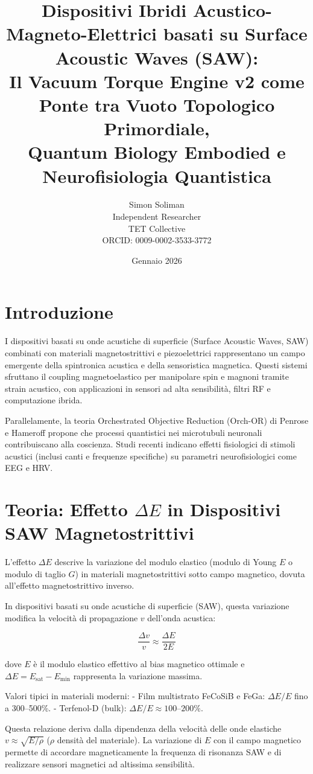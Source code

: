 \documentclass[11pt,a4paper]{article}
\title{Dispositivi Ibridi Acustico-Magneto-Elettrici basati su Surface Acoustic Waves (SAW): \\
Il Vacuum Torque Engine v2 come Ponte tra Vuoto Topologico Primordiale, \\
Quantum Biology Embodied e Neurofisiologia Quantistica}
\author{Simon Soliman \\
Independent Researcher \\
TET Collective \\
ORCID: 0009-0002-3533-3772}
\date{Gennaio 2026}
\begin{document}
\maketitle

\section{Introduzione}
I dispositivi basati su onde acustiche di superficie (Surface Acoustic Waves, SAW) combinati con materiali magnetostrittivi e piezoelettrici rappresentano un campo emergente della spintronica acustica e della sensoristica magnetica. Questi sistemi sfruttano il coupling magnetoelastico per manipolare spin e magnoni tramite strain acustico, con applicazioni in sensori ad alta sensibilità, filtri RF e computazione ibrida.

Parallelamente, la teoria Orchestrated Objective Reduction (Orch-OR) di Penrose e Hameroff propone che processi quantistici nei microtubuli neuronali contribuiscano alla coscienza. Studi recenti indicano effetti fisiologici di stimoli acustici (inclusi canti e frequenze specifiche) su parametri neurofisiologici come EEG e HRV.


\section{Teoria: Effetto $\Delta E$ in Dispositivi SAW Magnetostrittivi}

L'effetto $\Delta E$ descrive la variazione del modulo elastico (modulo di Young $E$ o modulo di taglio $G$) in materiali magnetostrittivi sotto campo magnetico, dovuta all'effetto magnetostrittivo inverso.

In dispositivi basati su onde acustiche di superficie (SAW), questa variazione modifica la velocità di propagazione $v$ dell'onda acustica:

\begin{equation}
\frac{\Delta v}{v} \approx \frac{\Delta E}{2E}
\end{equation}

dove $E$ è il modulo elastico effettivo al bias magnetico ottimale e $\Delta E = E_{\text{sat}} - E_{\text{min}}$ rappresenta la variazione massima.

Valori tipici in materiali moderni:
- Film multistrato FeCoSiB e FeGa: $\Delta E/E$ fino a 300–500\%.
- Terfenol-D (bulk): $\Delta E/E \approx 100–200\%$.

Questa relazione deriva dalla dipendenza della velocità delle onde elastiche $v \approx \sqrt{E / \rho}$ ($\rho$ densità del materiale). La variazione di $E$ con il campo magnetico permette di accordare magneticamente la frequenza di risonanza SAW e di realizzare sensori magnetici ad altissima sensibilità.
\end{document}
